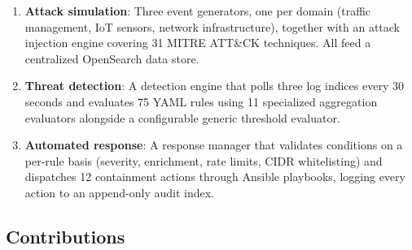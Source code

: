 \documentclass[conference,10pt]{IEEEtran}
\begin{document}
\begin{enumerate}[leftmargin=*]
    \item \textbf{Attack simulation}: Three event generators, one per domain (traffic management, IoT sensors, network infrastructure), together with an attack injection engine covering 31 MITRE ATT\&CK techniques. All feed a centralized OpenSearch data store.
    \item \textbf{Threat detection}: A detection engine that polls three log indices every 30 seconds and evaluates 75 YAML rules using 11 specialized aggregation evaluators alongside a configurable generic threshold evaluator.
    \item \textbf{Automated response}: A response manager that validates conditions on a per-rule basis (severity, enrichment, rate limits, CIDR whitelisting) and dispatches 12 containment actions through Ansible playbooks, logging every action to an append-only audit index.
\end{enumerate}

\subsection{Contributions}
\label{subsec:contributions}
\end{document}
